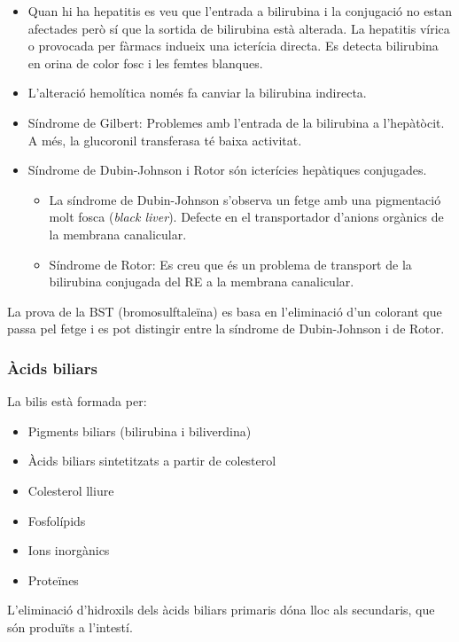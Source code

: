 \begin{itemize}
\item Quan hi ha hepatitis es veu que l'entrada a bilirubina i la conjugació
no estan afectades però sí que la sortida de bilirubina està
alterada. La hepatitis vírica o provocada per fàrmacs indueix una
icterícia directa. Es detecta bilirubina en orina de color fosc i les
femtes blanques.

\item L'alteració hemolítica només fa canviar la bilirubina indirecta.

\item Síndrome de Gilbert: Problemes amb l'entrada de la bilirubina a
  l'hepàtòcit. A més, la glucoronil transferasa té baixa activitat.

\item Síndrome de Dubin-Johnson i Rotor són icterícies hepàtiques
  conjugades. 
  \begin{itemize}
  \item La síndrome de Dubin-Johnson s'observa un fetge amb una
  pigmentació molt fosca (\textit{black liver}). Defecte en el
  transportador d'anions orgànics de la membrana canalicular.
\item Síndrome de Rotor: Es creu que és un problema de transport de la
  bilirubina conjugada del RE a la membrana canalicular.
  \end{itemize}

\end{itemize}

La prova de la BST (bromosulftaleïna) es basa en l'eliminació d'un
colorant que passa pel fetge i es pot distingir entre la síndrome de
Dubin-Johnson i de Rotor.

\subsubsection{Àcids biliars}
\label{sec:acids-biliars}
La bilis està formada per:
\begin{itemize}
\item Pigments biliars (bilirubina i biliverdina)
\item Àcids biliars sintetitzats a partir de colesterol
\item Colesterol lliure
\item Fosfolípids
\item Ions inorgànics
\item Proteïnes
\end{itemize}

L'eliminació d'hidroxils dels àcids biliars primaris dóna lloc als
secundaris, que són produïts a l'intestí.

